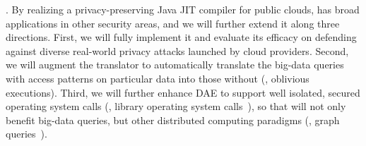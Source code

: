 

. By realizing a privacy-preserving Java JIT compiler 
for public clouds, \maat has broad applications in other security areas, and we 
will further extend it along three directions. First, we will fully implement 
it and evaluate its efficacy on defending against diverse real-world privacy 
attacks launched by cloud providers. Second, we will augment the translator to 
automatically translate the big-data queries with access patterns on particular 
data into those without (\eg, oblivious executions). Third, we will further 
enhance DAE to support well isolated, secured operating system calls (\eg, 
library operating system calls~\cite{graphene:atc17}), so that \maat will not 
only benefit big-data queries, but other distributed computing paradigms (\eg, 
graph queries~\cite{sigmod10:pregel}).



% 

